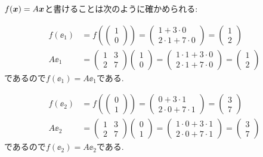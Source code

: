 \begin{checkanswer}%
$f(\boldsymbol{x})=A\boldsymbol{x}$と書けることは次のように確かめられる:

  \begin{align*}
    f(\ee_1) &=f(\begin{pmatrix}1\\0\end{pmatrix})
      =\begin{pmatrix}1+3\cdot0\\2\cdot 1+7\cdot 0 \end{pmatrix}
      =\begin{pmatrix}1\\2\end{pmatrix}\\
    A\ee_1&=\begin{pmatrix}1&3\\2&7\end{pmatrix}\begin{pmatrix}1\\0\end{pmatrix}
      =\begin{pmatrix}1\cdot 1+3\cdot 0\\2\cdot1+7\cdot 0\end{pmatrix}
      =\begin{pmatrix}1\\2\end{pmatrix}
  \end{align*}
  であるので$f(\ee_1)=A\ee_1$である.

  \begin{align*}
    f(\ee_2) &=f(\begin{pmatrix}0\\1\end{pmatrix})
      =\begin{pmatrix}0+3\cdot1\\2\cdot 0+7\cdot 1 \end{pmatrix}
      =\begin{pmatrix}3\\7\end{pmatrix}\\
    A\ee_2&=\begin{pmatrix}1&3\\2&7\end{pmatrix}\begin{pmatrix}0\\1\end{pmatrix}
      =\begin{pmatrix}1\cdot 0+3\cdot 1\\2\cdot0+7\cdot 1\end{pmatrix}
      =\begin{pmatrix}3\\7\end{pmatrix}
  \end{align*}
  であるので$f(\ee_2)=A\ee_2$である.
\end{checkanswer}

